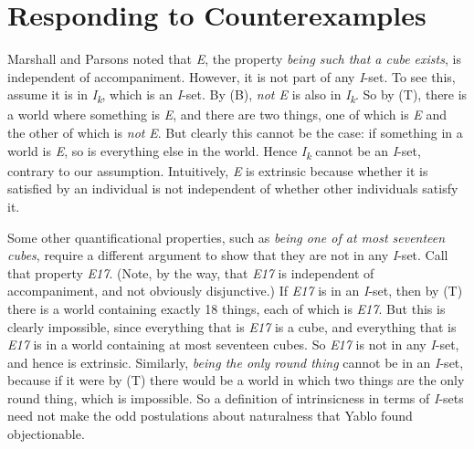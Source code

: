 \section{Responding to Counterexamples}
Marshall and Parsons noted that \textit{E}, the property \textit{being such that a cube exists}, is independent of accompaniment. However, it is not part of any \textit{I}\nobreakdash-set. To see this, assume it is in \textit{I}\textit{\textsubscript{k}}, which is an \textit{I}\nobreakdash-set. By (B), \textit{not E} is also in \textit{I}\textit{\textsubscript{k}}. So by (T), there is a world where something is \textit{E}, and there are two things, one of which is \textit{E} and the other of which is \textit{not} \textit{E}. But clearly this cannot be the case: if something in a world is \textit{E}, so is everything else in the world.  Hence \textit{I}\textit{\textsubscript{k}} cannot be an \textit{I}\nobreakdash-set, contrary to our assumption. Intuitively, \textit{E} is extrinsic because whether it is satisfied by an individual is not independent of whether other individuals satisfy it.

Some other quantificational properties, such as \textit{being one of at most seventeen cubes}, require a different argument to show that they are not in any \textit{I}\nobreakdash-set. Call that property \textit{E17}. (Note, by the way, that \textit{E17} is independent of accompaniment, and not obviously disjunctive.) If \textit{E17} is in an \textit{I}\nobreakdash-set, then by (T) there is a world containing exactly 18 things, each of which is \textit{E17}. But this is clearly impossible, since everything that is \textit{E17} is a cube, and everything that is \textit{E17} is in a world containing at most seventeen cubes. So \textit{E17} is not in any \textit{I}\nobreakdash-set, and hence is extrinsic. Similarly, \textit{being the only round thing} cannot be in an \textit{I}\nobreakdash-set, because if it were by (T) there would be a world in which two things are the only round thing, which is impossible. So a definition of intrinsicness in terms of \textit{I}\nobreakdash-sets need not make the odd postulations about naturalness that Yablo found objectionable.

